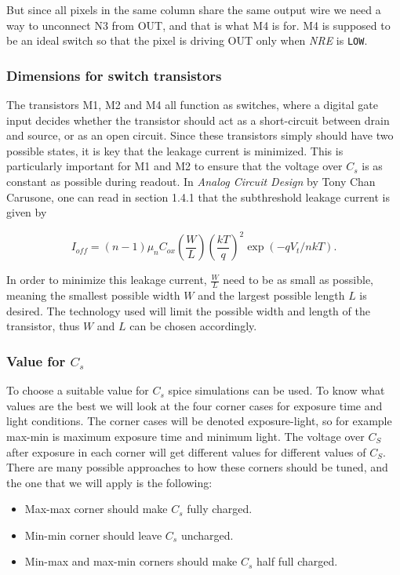 But since all pixels in the same column share the same output wire we need a way to unconnect N3 from OUT, and that is what M4 is for. M4 is supposed to be an ideal switch so that the pixel is driving OUT only when \emph{NRE} is \verb|LOW|.

\subsubsection{Dimensions for switch transistors}
\label{sec:switch_dimensions}
The transistors M1, M2 and M4 all function as switches, where a digital gate input decides whether the transistor should act as a short-circuit between drain and source, or as an open circuit. Since these transistors simply should have two possible states, it is key that the leakage current is minimized. This is particularly important for M1 and M2 to ensure that the voltage over $C_s$ is as constant as possible during readout. In \emph{Analog Circuit Design} by Tony Chan Carusone, one can read in section 1.4.1 that the subthreshold leakage current is given by

\begin{equation}
    \label{eq:leakage}
    I_{off} = (n-1) \mu_n C_{ox} \left( \frac{W}{L} \right) \left( \frac{kT}{q} \right)^2 \exp{(-qV_t / nkT)}.
\end{equation}

In order to minimize this leakage current, $\frac{W}{L}$ need to be as small as possible, meaning the smallest possible width $W$ and the largest possible length $L$ is desired. The technology used will limit the possible width and length of the transistor, thus $W$ and $L$ can be chosen accordingly.

\subsubsection{Value for $C_s$}

To choose a suitable value for $C_s$ spice simulations can be used. To know what values are the best we will look at the four corner cases for exposure time and light conditions. The corner cases will be denoted exposure-light, so for example max-min is maximum exposure time and minimum light. The voltage over $C_S$ after exposure in each corner will get different values for different values of $C_S$. There are many possible approaches to how these corners should be tuned, and the one that we will apply is the following:

\begin{itemize}
    \item Max-max corner should make $C_s$ fully charged.
    \item Min-min corner should leave $C_s$ uncharged.
    \item Min-max and max-min corners should make $C_s$ half full charged.
\end{itemize}

